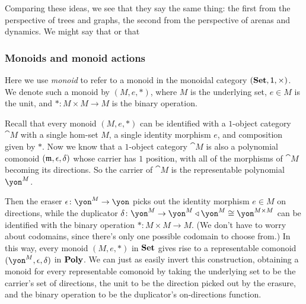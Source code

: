 \documentclass[Book-Poly]{subfiles}
\begin{document}
Comparing these ideas, we see that they say the same thing: the first from the perspective of trees and graphs, the second from the perspective of arenas and dynamics.
We might say that
or that

\subsubsection{Monoids and monoid actions}

Here we use \emph{monoid} to refer to a monoid in the monoidal category $(\mathbf{Set},\textsf{1},\times)$.
We denote such a monoid by $(M,e,*)$, where $M$ is the underlying set, $e\in M$ is the unit, and $*\colon M\times M\to M$ is the binary operation.

\begin{example}\label{ex.monoids}
Recall that every monoid $(M,e,*)$ can be identified with a $1$-object category $\cat{M}$ with a single hom-set $M$, a single identity morphism $e$, and composition given by $*$.
Now we know that a $1$-object category $\cat{M}$ is also a polynomial comonoid $(\mathfrak{m},\epsilon,\delta)$ whose carrier has $1$ position, with all of the morphisms of $\cat{M}$ becoming its directions.
So the carrier of $\cat{M}$ is the representable polynomial $\yon^M$.

Then the eraser $\epsilon\colon\yon^M\to\yon$ picks out the identity morphism $e\in M$ on directions, while the duplicator $\delta\colon\yon^M\to\yon^M\tri\yon^M\iso\yon^{M\times M}$ can be identified with the binary operation $*\colon M\times M\to M$.
(We don't have to worry about codomains, since there's only one possible codomain to choose from.)
In this way, every monoid $(M,e,*)$ in $\mathbf{Set}$ gives rise to a representable comonoid $(\yon^M,\epsilon,\delta)$ in $\mathbf{Poly}$.
We can just as easily invert this construction, obtaining a monoid for every representable comonoid by taking the underlying set to be the carrier's set of directions, the unit to be the direction picked out by the erasure, and the binary operation to be the duplicator's on-directions function.


\end{example}
\end{document}
